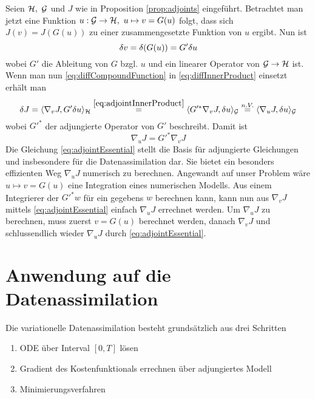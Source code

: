 Seien $\mathcal{H},~\mathcal{G}$ und $J$ wie in Proposition \ref{prop:adjoints} eingeführt. Betrachtet man jetzt eine Funktion $u:\mathcal{G} \to \mathcal{H}, ~u\mapsto v = G(u)$ folgt, dass sich $J(v) = J(G(u))$ zu einer zusammengesetzte Funktion von $u$ ergibt. Nun ist 
\begin{equation}
\label{eq:diffCompoundFunction}
\delta v = \delta(G(u)) = G'\delta u
\end{equation}
wobei $G'$ die Ableitung von $G$ bzgl. $u$ und ein linearer Operator von $\mathcal{G}\to\mathcal{H}$ ist. Wenn man nun \eqref{eq:diffCompoundFunction} in \eqref{eq:diffInnerProduct} einsetzt erhält man 
\begin{equation}
 \delta J = \langle \nabla_v J,G'\delta u\rangle_{\mathcal{H}} \overset{\eqref{eq:adjointInnerProduct}}{=}  \langle G'^* \nabla_v J,\delta u\rangle_{\mathcal{G}} \overset{n.V.}{=} \langle \nabla_u J,\delta u\rangle_{\mathcal{G}} 
\end{equation}
wobei $G'^*$ der adjungierte Operator von $G'$ beschreibt. Damit ist 
\begin{equation}
\label{eq:adjointEssential}
\nabla_u J = G'^*\nabla_v J
\end{equation} 
Die Gleichung \eqref{eq:adjointEssential} stellt die Basis für adjungierte Gleichungen und insbesondere für die Datenassimilation dar. Sie bietet ein besonders effizienten Weg $\nabla_u J$ numerisch zu berechnen. Angewandt auf unser Problem wäre $u\mapsto v =G(u) $ eine Integration eines numerischen Modells. Aus einem Integrierer der $G'^*w$ für ein gegebens $w$ berechnen kann, kann nun aus $\nabla_v J$ mittels \eqref{eq:adjointEssential} einfach $\nabla_u J$ errechnet werden. 
Um $\nabla_u J$ zu berechnen, muss zuerst $v = G(u)$ berechnet werden, danach $\nabla_v J$ und schlussendlich wieder $\nabla_u J$ durch \eqref{eq:adjointEssential}.

\section{Anwendung auf die Datenassimilation}







Die variationelle Datenassimilation besteht grundsätzlich aus drei Schritten
\begin{enumerate}
 \item ODE über Interval $[0,T]$ lösen
 \item Gradient des Kostenfunktionals errechnen über adjungiertes Modell
 \item Minimierungsverfahren 
\end{enumerate}